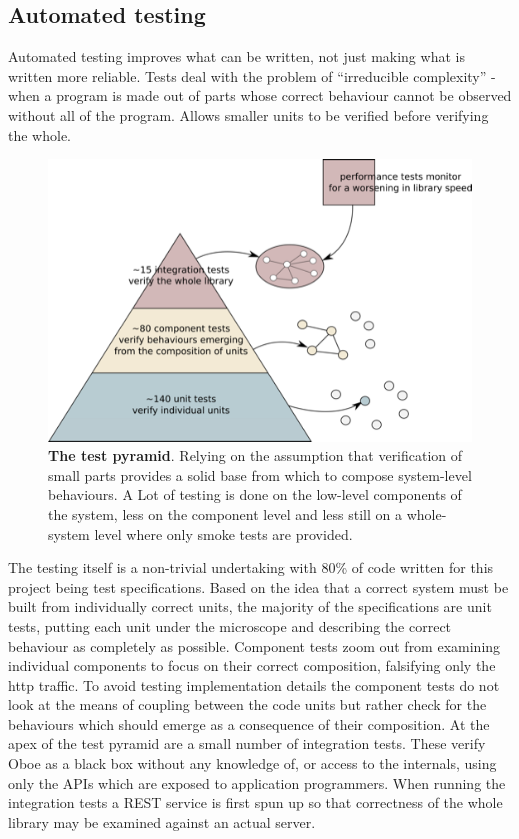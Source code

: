 \documentclass[]{article}
\makeatletter
\def\maxwidth{\ifdim\Gin@nat@width>\linewidth\linewidth
\else\Gin@nat@width\fi}
\let\Oldincludegraphics\includegraphics
\renewcommand{\includegraphics}[1]{\Oldincludegraphics[width=\maxwidth]{#1}}
\makeatother
\begin{document}
\subsection{Automated testing}

Automated testing improves what can be written, not just making what is
written more reliable. Tests deal with the problem of ``irreducible
complexity'' - when a program is made out of parts whose correct
behaviour cannot be observed without all of the program. Allows smaller
units to be verified before verifying the whole.

\begin{figure}[htbp]
\centering
\includegraphics{images/testPyramid.png}
\caption{\textbf{The test pyramid}. Relying on the assumption that
verification of small parts provides a solid base from which to compose
system-level behaviours. A Lot of testing is done on the low-level
components of the system, less on the component level and less still on
a whole-system level where only smoke tests are provided.
\label{testpyramid}}
\end{figure}

The testing itself is a non-trivial undertaking with 80\% of code
written for this project being test specifications. Based on the idea
that a correct system must be built from individually correct units, the
majority of the specifications are unit tests, putting each unit under
the microscope and describing the correct behaviour as completely as
possible. Component tests zoom out from examining individual components
to focus on their correct composition, falsifying only the http traffic.
To avoid testing implementation details the component tests do not look
at the means of coupling between the code units but rather check for the
behaviours which should emerge as a consequence of their composition. At
the apex of the test pyramid are a small number of integration tests.
These verify Oboe as a black box without any knowledge of, or access to
the internals, using only the APIs which are exposed to application
programmers. When running the integration tests a REST service is first
spun up so that correctness of the whole library may be examined against
an actual server.
\end{document}
